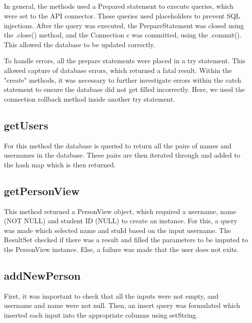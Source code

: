 \documentclass{article}
\begin{document}
\subsection*{}

In general, the methods used a Prepared statement to execute queries, which were set to the API connector. These queries used placeholders to prevent SQL injections. After the query was executed, the PrepareStatement was closed using the .close() method, and the Connection c was committed, using the .commit(). This allowed the database to be updated correctly.

To handle errors, all the prepare statements were placed in a try statement. This allowed capture of database errors, which returned a fatal result. Within the "create" methods, it was necessary to further investigate errors within the catch statement to ensure the database did not get filled incorrectly. Here, we used the connection rollback method inside another try statement.

\subsection*{getUsers}

For this method the database is queried to return all the pairs of names and usernames in the database. These pairs are then iterated through and added to the hash map which is then returned.

\subsection*{getPersonView}

This method returned a PersonView object, which required a username, name (NOT NULL) and student ID (NULL) to create an instance. For this, a query was made which selected name and stuId based on the input username. The ResultSet checked if there was a result and filled the parameters to be imputed to the PersonView instance. Else, a failure was made that the user does not exits.

\subsection*{addNewPerson}

First, it was important to check that all the inputs were not empty, and username and name were not null. Then, an insert query was formulated which inserted each input into the appropriate columns using setString.
\end{document}
